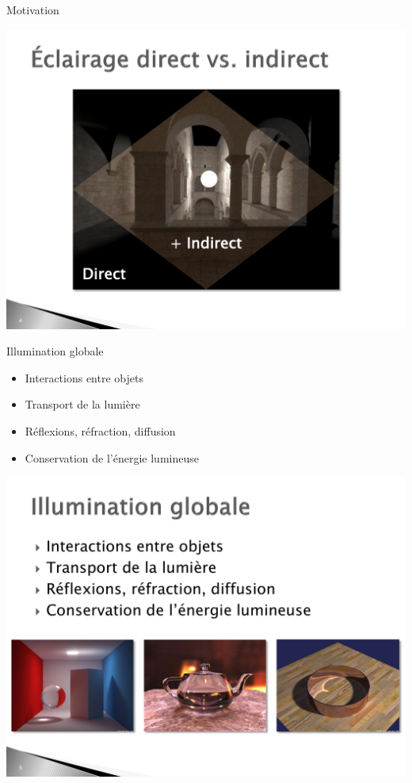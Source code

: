 \begin{frame}{Motivation}
    \begin{center}
        \includegraphics[width=.7\textwidth]{figs/motivation.pdf}
    \end{center}
\end{frame}

\begin{frame}{Illumination globale}
\begin{itemize}
    \item Interactions entre objets 
    \item Transport de la lumière 
    \item Réflexions, réfraction, diffusion
    \item Conservation de l'énergie lumineuse 
\end{itemize}
\begin{center}
    \includegraphics[width=\textwidth]{figs/illumination-globale.pdf}
\end{center}
\end{frame}

